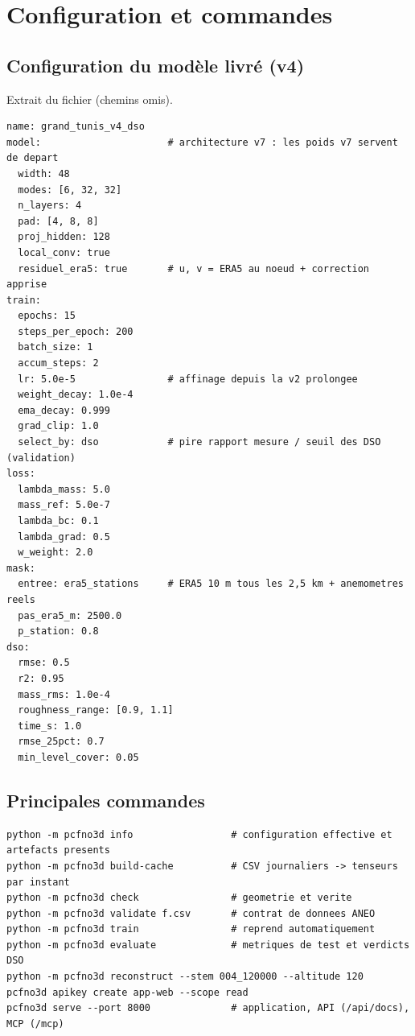 \chapter{Configuration et commandes}
\label{ann:config}

\section{Configuration du modèle livré (v4)}
Extrait du fichier  (chemins omis).

\begin{lstlisting}
name: grand_tunis_v4_dso
model:                      # architecture v7 : les poids v7 servent de depart
  width: 48
  modes: [6, 32, 32]
  n_layers: 4
  pad: [4, 8, 8]
  proj_hidden: 128
  local_conv: true
  residuel_era5: true       # u, v = ERA5 au noeud + correction apprise
train:
  epochs: 15
  steps_per_epoch: 200
  batch_size: 1
  accum_steps: 2
  lr: 5.0e-5                # affinage depuis la v2 prolongee
  weight_decay: 1.0e-4
  ema_decay: 0.999
  grad_clip: 1.0
  select_by: dso            # pire rapport mesure / seuil des DSO (validation)
loss:
  lambda_mass: 5.0
  mass_ref: 5.0e-7
  lambda_bc: 0.1
  lambda_grad: 0.5
  w_weight: 2.0
mask:
  entree: era5_stations     # ERA5 10 m tous les 2,5 km + anemometres reels
  pas_era5_m: 2500.0
  p_station: 0.8
dso:
  rmse: 0.5
  r2: 0.95
  mass_rms: 1.0e-4
  roughness_range: [0.9, 1.1]
  time_s: 1.0
  rmse_25pct: 0.7
  min_level_cover: 0.05
\end{lstlisting}

\section{Principales commandes}
\begin{lstlisting}
python -m pcfno3d info                 # configuration effective et artefacts presents
python -m pcfno3d build-cache          # CSV journaliers -> tenseurs par instant
python -m pcfno3d check                # geometrie et verite
python -m pcfno3d validate f.csv       # contrat de donnees ANEO
python -m pcfno3d train                # reprend automatiquement
python -m pcfno3d evaluate             # metriques de test et verdicts DSO
python -m pcfno3d reconstruct --stem 004_120000 --altitude 120
pcfno3d apikey create app-web --scope read
pcfno3d serve --port 8000              # application, API (/api/docs), MCP (/mcp)
\end{lstlisting}

